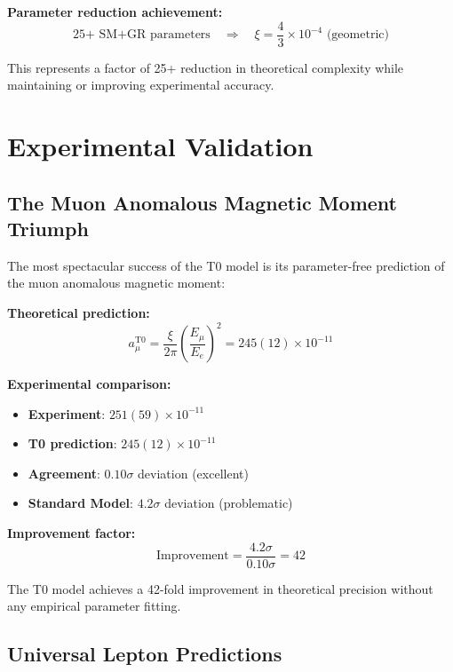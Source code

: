 \documentclass[12pt,a4paper]{report}
\begin{document}
\textbf{Parameter reduction achievement:}
\begin{equation}
	\text{25+ SM+GR parameters} \quad \Rightarrow \quad \xi = \frac{4}{3} \times 10^{-4} \text{ (geometric)}
\end{equation}

This represents a factor of 25+ reduction in theoretical complexity while maintaining or improving experimental accuracy.

\section{Experimental Validation}
\label{sec:experimental_validation}

\subsection{The Muon Anomalous Magnetic Moment Triumph}
\label{subsec:muon_triumph}

The most spectacular success of the T0 model is its parameter-free prediction of the muon anomalous magnetic moment:

\textbf{Theoretical prediction:}
\begin{equation}
	a_\mu^{\text{T0}} = \frac{\xi}{2\pi} \left(\frac{E_\mu}{E_e}\right)^2 = 245(12) \times 10^{-11}
\end{equation}

\textbf{Experimental comparison:}
\begin{itemize}
	\item \textbf{Experiment}: $251(59) \times 10^{-11}$
	\item \textbf{T0 prediction}: $245(12) \times 10^{-11}$
	\item \textbf{Agreement}: $0.10\sigma$ deviation (excellent)
	\item \textbf{Standard Model}: $4.2\sigma$ deviation (problematic)
\end{itemize}

\textbf{Improvement factor:}
\begin{equation}
	\text{Improvement} = \frac{4.2\sigma}{0.10\sigma} = 42
\end{equation}

The T0 model achieves a 42-fold improvement in theoretical precision without any empirical parameter fitting.

\subsection{Universal Lepton Predictions}
\label{subsec:universal_lepton_predictions}
\end{document}
